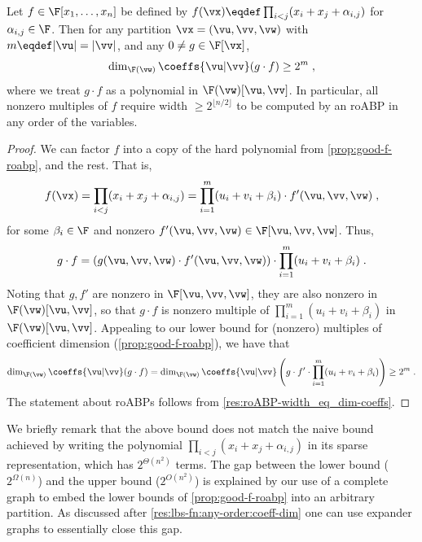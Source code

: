 \documentclass{toc}
\begin{document}
\begin{corollary}\label{cor:lbs-mult:every-partition}
        Let $f\in\F[x_1,\ldots,x_n]$ be defined by $f(\vx)\eqdef\prod_{i<j}(x_i+x_j+\alpha_{i,j})$ for $\alpha_{i,j}\in\F$.  Then for any partition $\vx=(\vu,\vv,\vw)$ with $m\eqdef|\vu|=|\vv|$, and any $0\ne g\in\F[\vx]$,
        \[
                \dim_{\F(\vw)}\coeffs{\vu|\vv}(g\cdot f)\ge 2^m
                \;,
        \]
        where we treat $g\cdot f$ as a polynomial in $\F(\vw)[\vu,\vv]$.  In particular, all nonzero multiples of $f$ require width $\ge 2^{\lfloor n/2 \rfloor}$ to be computed by an roABP in any order of the variables.
\end{corollary}
\begin{proof}
        We can factor $f$ into a copy of the hard polynomial from \autoref{prop:good-f-roabp}, and the rest.  That is,
        \begin{align*}
                f(\vx)
                =\prod_{i<j} (x_i+x_j+\alpha_{i,j})
                =\prod_{i=1}^m(u_i+v_i+\beta_i)\cdot f'(\vu,\vv,\vw)
                \;,
        \end{align*}
        for some $\beta_i\in\F$ and nonzero $f'(\vu,\vv,\vw)\in\F[\vu,\vv,\vw]$.  Thus,
        \[
                g\cdot f
                =\left(g(\vu,\vv,\vw)\cdot f'(\vu,\vv,\vw)\right)\cdot \prod_{i=1}^m(u_i+v_i+\beta_i)
                \;.
        \]
        Noting that $g,f'$ are nonzero in $\F[\vu,\vv,\vw]$, they are also nonzero in $\F(\vw)[\vu,\vv]$, so that $g\cdot f$ is nonzero multiple of $\prod_{i=1}^m(u_i+v_i+\beta_i)$ in $\F(\vw)[\vu,\vv]$.  Appealing to our lower bound for (nonzero) multiples of coefficient dimension (\autoref{prop:good-f-roabp}), we have that
        \[
                \dim_{\F(\vw)}\coeffs{\vu|\vv}(g\cdot f)
                =\dim_{\F(\vw)}\coeffs{\vu|\vv}\left(g\cdot f'\cdot \prod_{i=1}^m(u_i+v_i+\beta_i)\right)
                \ge 2^m
                \;.
        \]
        The statement about roABPs follows from \autoref{res:roABP-width_eq_dim-coeffs}.
\end{proof}

We briefly remark that the above bound does not match the naive bound achieved by writing the polynomial $\prod_{i<j}(x_i+x_j+\alpha_{i,j})$ in its sparse representation, which has $2^{\Theta(n^2)}$ terms.  The gap between the lower bound ($2^{\Omega(n)}$) and the upper bound ($2^{O(n^2)}$) is explained by our use of a complete graph to embed the lower bounds of \autoref{prop:good-f-roabp} into an arbitrary partition.  As discussed after \autoref{res:lbs-fn:any-order:coeff-dim} one can use expander graphs to essentially close this gap.
\end{document}
